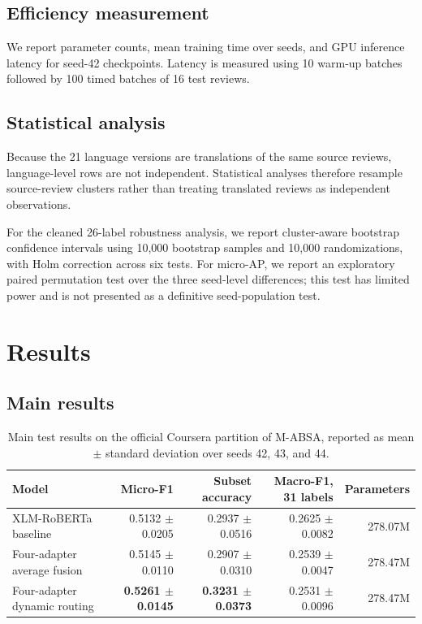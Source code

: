 \documentclass[review,12pt]{elsarticle}
\begin{document}
\subsection{Efficiency measurement}
We report parameter counts, mean training time over seeds, and GPU inference latency for seed-42 checkpoints. Latency is measured using 10 warm-up batches followed by 100 timed batches of 16 test reviews.

\subsection{Statistical analysis}
Because the 21 language versions are translations of the same source reviews, language-level rows are not independent. Statistical analyses therefore resample source-review clusters rather than treating translated reviews as independent observations.

For the cleaned 26-label robustness analysis, we report cluster-aware bootstrap confidence intervals using 10,000 bootstrap samples and 10,000 randomizations, with Holm correction across six tests. For micro-AP, we report an exploratory paired permutation test over the three seed-level differences; this test has limited power and is not presented as a definitive seed-population test.

\section{Results}

\subsection{Main results}
\begin{table}[htbp]
\centering
\caption{Main test results on the official Coursera partition of M-ABSA, reported as mean $\pm$ standard deviation over seeds 42, 43, and 44.}
\label{tab:main}
\begin{tabular}{lrrrr}
\toprule
Model & Micro-F1 & Subset accuracy & Macro-F1, 31 labels & Parameters \\
\midrule
XLM-RoBERTa baseline & 0.5132 $\pm$ 0.0205 & 0.2937 $\pm$ 0.0516 & 0.2625 $\pm$ 0.0082 & 278.07M \\
Four-adapter average fusion & 0.5145 $\pm$ 0.0110 & 0.2907 $\pm$ 0.0310 & 0.2539 $\pm$ 0.0047 & 278.47M \\
Four-adapter dynamic routing & \textbf{0.5261 $\pm$ 0.0145} & \textbf{0.3231 $\pm$ 0.0373} & 0.2531 $\pm$ 0.0096 & 278.47M \\
\bottomrule
\end{tabular}
\end{table}
\end{document}
